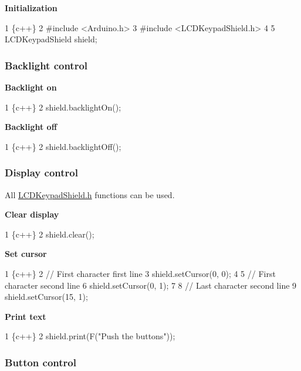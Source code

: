 {\bfseries Initialization}


\begin{DoxyCode}
1 \{c++\}
2 #include <Arduino.h>
3 #include <LCDKeypadShield.h>
4 
5 LCDKeypadShield shield;
\end{DoxyCode}


\subsubsection*{Backlight control}

{\bfseries Backlight on}


\begin{DoxyCode}
1 \{c++\}
2 shield.backlightOn();
\end{DoxyCode}


{\bfseries Backlight off}


\begin{DoxyCode}
1 \{c++\}
2 shield.backlightOff();
\end{DoxyCode}


\subsubsection*{Display control}

All {\ttfamily \hyperlink{_l_c_d_keypad_shield_8h}{L\+C\+D\+Keypad\+Shield.\+h}} functions can be used.

{\bfseries Clear display}


\begin{DoxyCode}
1 \{c++\}
2 shield.clear();
\end{DoxyCode}


{\bfseries Set cursor}


\begin{DoxyCode}
1 \{c++\}
2 // First character first line
3 shield.setCursor(0, 0);
4 
5 // First character second line
6 shield.setCursor(0, 1);
7 
8 // Last character second line
9 shield.setCursor(15, 1);
\end{DoxyCode}


{\bfseries Print text}


\begin{DoxyCode}
1 \{c++\}
2 shield.print(F("Push the buttons"));
\end{DoxyCode}


\subsubsection*{Button control}

